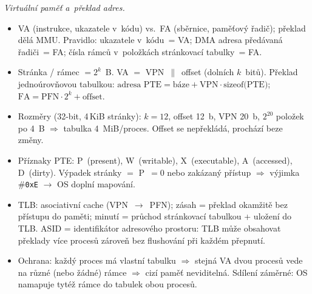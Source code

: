 \documentclass[11pt,a4paper]{article}
\begin{document}
\begin{poznamka}
\smallskip
\emph{Virtuální paměť a~překlad adres.}
\begin{itemize}
  \item VA (instrukce, ukazatele v~kódu) vs.\ FA (sběrnice, paměťový řadič); překlad dělá MMU. Pravidlo: ukazatele v~kódu~= VA; DMA adresa předávaná řadiči~= FA; čísla rámců v~položkách stránkovací tabulky~= FA.
  \item Stránka / rámec $= 2^{k}$~B. VA $=$ VPN~$\|$~offset (dolních $k$~bitů). Překlad jednoúrovňovou tabulkou: $\text{adresa PTE} = \text{báze} + \text{VPN}{\cdot}\text{sizeof(PTE)}$; \, $\text{FA} = \text{PFN}{\cdot}2^{k} + \text{offset}$.
  \item Rozměry (32-bit, 4\,KiB stránky): $k=12$, offset 12~b, VPN 20~b, $2^{20}$ položek po 4~B $\Rightarrow$ tabulka 4~MiB/proces. Offset se nepřekládá, prochází beze změny.
  \item Příznaky PTE: P~(present), W~(writable), X~(executable), A~(accessed), D~(dirty). Výpadek stránky $=$ P~$=0$ nebo zakázaný přístup $\Rightarrow$ výjimka \#\texttt{0xE} $\to$ OS doplní mapování.
  \item TLB: asociativní cache (VPN~$\to$~PFN); zásah = překlad okamžitě bez přístupu do paměti; minutí = průchod stránkovací tabulkou + uložení do TLB. ASID = identifikátor adresového prostoru: TLB může obsahovat překlady více procesů zároveň bez flushování při každém přepnutí.
  \item Ochrana: každý proces má vlastní tabulku $\Rightarrow$ stejná VA dvou procesů vede na různé (nebo žádné) rámce $\Rightarrow$ cizí paměť neviditelná. Sdílení záměrné: OS namapuje tytéž rámce do tabulek obou procesů.
\end{itemize}


\end{poznamka}
\end{document}
